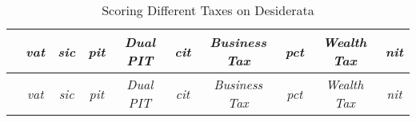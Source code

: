 \begin{landscape}
\begin{longtabu}{p{4cm}ccccccccc}
\caption[Scoring Different Taxes on Desiderata]{Scoring Different Taxes on Desiderata}\\ \toprule  &\emph{vat}	&\emph{sic}	&\emph{pit}		&\emph{Dual PIT}	&\emph{cit}	&\emph{Business Tax}	&\emph{pct}	&\emph{Wealth Tax} 	&\emph{nit}\vspace{15pt} \\  \midrule \endfirsthead

\toprule
 &\emph{vat}	&\emph{sic}	&\emph{pit}		&\emph{Dual PIT}	&\emph{cit}	&\emph{Business Tax}	&\emph{pct}	&\emph{Wealth Tax} 	&\emph{nit}\vspace{15pt} \\ \midrule \endhead



\end{longtabu}
\end{landscape}
